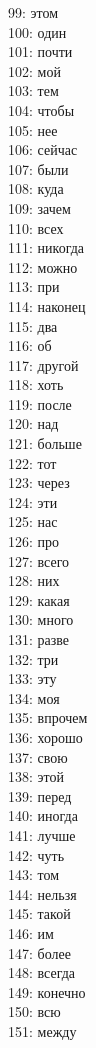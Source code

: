 \documentclass[14pt]{matmex-diploma-custom}
\begin{document}
\begin{appendices}
\begin{multicols}{5}
99: этом\\
100: один\\
101: почти\\
102: мой\\
103: тем\\
104: чтобы\\
105: нее\\
106: сейчас\\
107: были\\
108: куда\\
109: зачем\\
110: всех\\
111: никогда\\
112: можно\\
113: при\\
114: наконец\\
115: два\\
116: об\\
117: другой\\
118: хоть\\
119: после\\
120: над\\
121: больше\\
122: тот\\
123: через\\
124: эти\\
125: нас\\
126: про\\
127: всего\\
128: них\\
129: какая\\
130: много\\
131: разве\\
132: три\\
133: эту\\
134: моя\\
135: впрочем\\
136: хорошо\\
137: свою\\
138: этой\\
139: перед\\
140: иногда\\
141: лучше\\
142: чуть\\
143: том\\
144: нельзя\\
145: такой\\
146: им\\
147: более\\
148: всегда\\
149: конечно\\
150: всю\\
151: между\\
\end{multicols}


\end{appendices}
\end{document}
